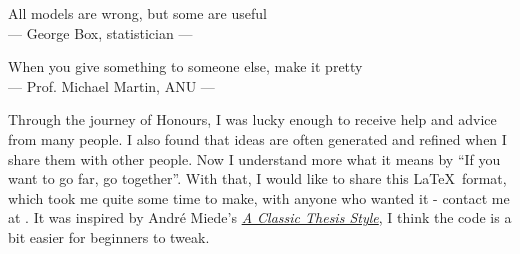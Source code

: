 \thispagestyle{empty}

\vspace*{3cm}

\begin{center}
All models are wrong, but some are useful \\ \medskip
--- George Box, statistician ---   

When you give something to someone else, make it pretty \\ \medskip
--- Prof. Michael Martin, ANU ---   

\end{center}

\vspace{2cm}

Through the journey of Honours, I was lucky enough to receive help and advice from many people. I also found that ideas are often generated and refined when I share them with other people. Now I understand more what it means by ``If you want to go far, go together''. With that, I would like to share this \LaTeX\ format, which took me quite some time to make, with anyone who wanted it - contact me at  . It was inspired by André Miede's \href{https://bitbucket.org/amiede/classicthesis/wiki/Home}{\textit{A Classic Thesis Style}}, I think the code is a bit easier for beginners to tweak.